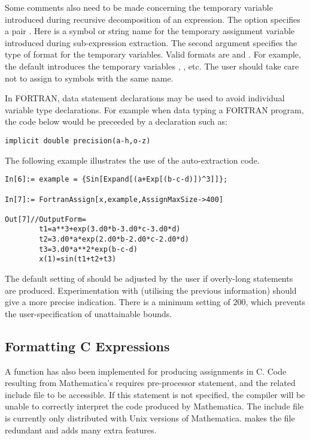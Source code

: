 \documentclass [12pt,twoside]{article}
\begin{document}
Some comments also need to be made concerning the temporary variable introduced during
recursive decomposition of an expression. The option 
specifies a pair . Here  is a symbol or string name
for the temporary assignment variable introduced during sub-expression extraction.
The second argument  specifies the type of format for the temporary variables.
Valid formats are  and . For example, the default
 introduces the temporary variables , , etc. The
user should take care not to assign to symbols with the same name.

In FORTRAN,  data statement declarations may be used to avoid
individual variable type declarations. For example when data typing a FORTRAN
program, the code below would be preceeded by a declaration such as:
\begin{verbatim}
implicit double precision(a-h,o-z)
\end{verbatim}
The following example illustrates the use of the auto-extraction code.

\begin{verbatim}
In[6]:= example = {Sin[Expand[(a+Exp[(b-c-d)])^3]]};

In[7]:= FortranAssign[x,example,AssignMaxSize->400]

Out[7]//OutputForm=
        t1=a**3+exp(3.d0*b-3.d0*c-3.d0*d)
        t2=3.d0*a*exp(2.d0*b-2.d0*c-2.d0*d)
        t3=3.d0*a**2*exp(b-c-d)
        x(1)=sin(t1+t2+t3)
\end{verbatim}
The default setting of  should be adjusted by the user if
overly-long statements are produced. Experimentation with 
(utilising the previous information) should give a more precise indication. There
is a minimum setting of $200$, which prevents the user-specification of unattainable
bounds.

\pagebreak[2]

\subsection{Formatting C Expressions}\label{c_form}
A function  has also been implemented for producing
assignments in C. Code resulting from Mathematica's  requires
pre-processor statement,  and the related include file
to be accessible. If this statement is not specified, the compiler will
be unable to correctly interpret the code produced by Mathematica. The include file
 is currently only distributed with Unix versions of Mathematica.
 makes the file redundant and adds many extra features.
\end{document}
